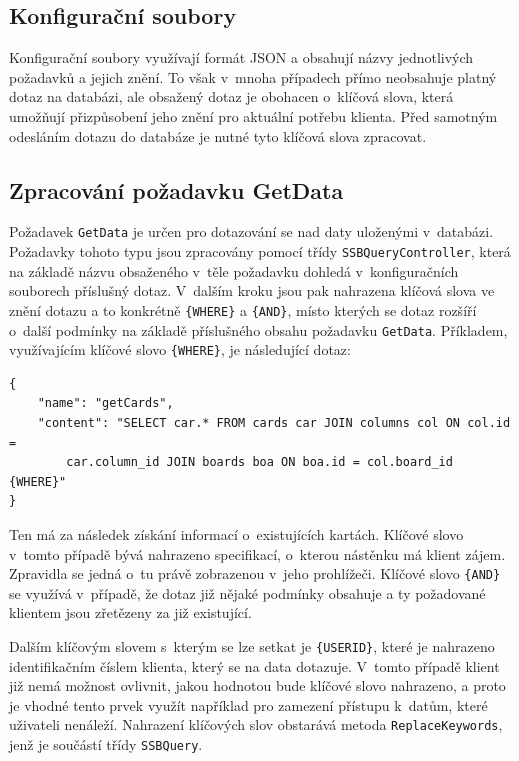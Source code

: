 \subsection{Konfigurační soubory}
Konfigurační soubory využívají formát JSON a obsahují názvy jednotlivých požadavků a jejich znění. To však v~mnoha případech přímo neobsahuje platný dotaz na databázi, ale obsažený dotaz je obohacen o~klíčová slova, která umožňují přizpůsobení jeho znění pro aktuální potřebu klienta. Před samotným odesláním dotazu do databáze je nutné tyto klíčová slova zpracovat.


\subsection{Zpracování požadavku GetData}\label{sec:getdata}
Požadavek \texttt{GetData} je určen pro dotazování se nad daty uloženými v~databázi. Požadavky tohoto typu jsou zpracovány pomocí třídy \texttt{SSBQueryController}, která na základě názvu obsaženého v~těle požadavku dohledá v~konfiguračních souborech příslušný dotaz. V~dalším kroku jsou pak nahrazena klíčová slova ve znění dotazu a to konkrétně \texttt{\{WHERE\}} a \texttt{\{AND\}}, místo kterých se dotaz rozšíří o~další podmínky na základě příslušného obsahu požadavku \texttt{GetData}. Příkladem, využívajícím klíčové slovo \texttt{\{WHERE\}}, je následující dotaz:

\begin{verbatim}
{
    "name": "getCards",
    "content": "SELECT car.* FROM cards car JOIN columns col ON col.id = 
        car.column_id JOIN boards boa ON boa.id = col.board_id {WHERE}"
}
\end{verbatim}

Ten má za následek získání informací o~existujících kartách. Klíčové slovo v~tomto případě bývá nahrazeno specifikací, o~kterou nástěnku má klient zájem. Zpravidla se jedná o~tu právě zobrazenou v~jeho prohlížeči. Klíčové slovo \texttt{\{AND\}} se využívá v~případě, že dotaz již nějaké podmínky obsahuje a ty požadované klientem jsou zřetězeny za již existující.

Dalším klíčovým slovem s~kterým se lze setkat je \texttt{\{USERID\}}, které je nahrazeno identifikačním číslem klienta, který se na data dotazuje. V~tomto případě klient již nemá možnost ovlivnit, jakou hodnotou bude klíčové slovo nahrazeno, a proto je vhodné tento prvek využít například pro zamezení přístupu k~datům, které uživateli nenáleží.
Nahrazení klíčových slov obstarává metoda \texttt{ReplaceKeywords}, jenž je součástí třídy \texttt{SSBQuery}.

